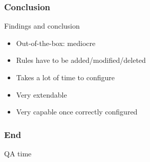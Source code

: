 \documentclass{beamer}
\begin{document}
\begin{frame}
\frametitle{Conclusion}
\begin{block}{Findings and conclusion}
\begin{itemize}
\item Out-of-the-box: mediocre
\item Rules have to be added/modified/deleted
\item Takes a lot of time to configure
\item Very extendable
\item Very capable once correctly configured
\end{itemize}
\end{block}
\end{frame}

\begin{frame}
\frametitle{End}
QA time
\end{frame}
\end{document}
